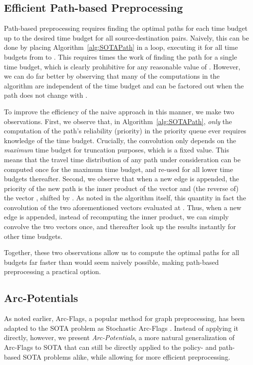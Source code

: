 \documentclass[oribibl]{llncs}
\begin{document}
	\subsection{Efficient Path-based Preprocessing}
		Path-based preprocessing requires finding the optimal paths for each time budget up to the desired time
		budget  for all source-destination pairs.
		Naively, this can be done by placing Algorithm~\ref{alg:SOTAPath} in a loop,
		executing it for all time budgets from  to .
		This requires  times the work of finding the path for a single time budget,
		which is clearly prohibitive for any reasonable value of .
		However, we can do far better by observing that many of the computations in the algorithm are
		independent of the time budget and can be factored out when the path does not change with .

		To improve the efficiency of the naive approach in this manner, we make two observations.
		First, we observe that, in Algorithm~\ref{alg:SOTAPath}, \textit{only} the computation of
		the path's reliability (priority) in the priority queue ever requires knowledge of the time budget.
		Crucially, the convolution  only depends on the \textit{maximum}
		time budget  for truncation purposes, which is a fixed value.
		This means that the travel time distribution of any path under consideration can be computed
		once for the maximum time budget, and re-used for all lower time budgets thereafter.
		Second, we observe that when a new edge is appended, the priority of the new path is the inner product
		of the vector  and (the reverse of) the vector , shifted by .
		As noted in the algorithm itself, this quantity in fact the convolution
		of the two aforementioned vectors evaluated at .
		Thus, when a new edge is appended, instead of recomputing the inner product, we can simply
		convolve the two vectors once, and thereafter look up the results instantly for other time budgets.

		Together, these two observations allow us to compute the optimal paths for all budgets far faster than
		would seem naively possible, making path-based preprocessing a practical option.

	\subsection{Arc-Potentials}
		As noted earlier, Arc-Flags, a popular method for graph preprocessing,
		has been adapted to the SOTA problem as Stochastic Arc-Flags \cite*{sabran2014precomputation}.
		Instead of applying it directly, however, we present \textit{Arc-Potentials}, a more
		natural generalization of Arc-Flags to SOTA that can still be directly applied to the policy- and
		path-based SOTA problems alike, while allowing for more efficient preprocessing.
\end{document}
